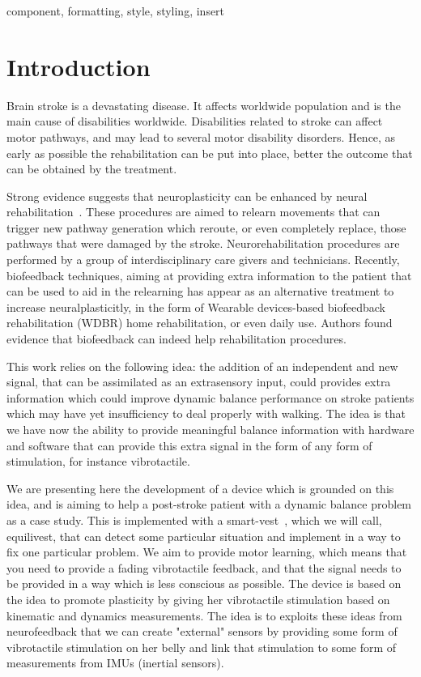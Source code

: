 \documentclass[conference]{IEEEtran}
\begin{document}
\begin{IEEEkeywords}
component, formatting, style, styling, insert
\end{IEEEkeywords}

\section{Introduction}

Brain stroke is a devastating disease.  It affects worldwide population and is the main cause of disabilities worldwide.  Disabilities related to stroke can affect motor pathways, and may lead to several motor disability disorders.  Hence, as early as possible the rehabilitation can be put into place, better the outcome that can be obtained by the treatment.   

Strong evidence suggests that neuroplasticity can be enhanced by neural rehabilitation~\cite{Albert.etal2012}.  These procedures are aimed to relearn movements that can trigger new pathway generation which reroute, or even completely replace, those pathways that were damaged by the stroke.  Neurorehabilitation procedures are performed by a group of interdisciplinary care givers and technicians.  Recently, biofeedback techniques, aiming at providing extra information to the patient that can be used to aid in the relearning has appear as an alternative treatment to increase neuralplasticitly, in the form of Wearable devices-based biofeedback rehabilitation (WDBR) home rehabilitation, or even daily use\cite{Peake.etal2018}.  Authors found evidence that biofeedback can indeed help rehabilitation procedures.

This work relies on the following idea:  the addition of an independent and new signal, that can be assimilated as an extrasensory input, could  provides extra information which could improve dynamic balance performance on stroke patients which may have yet insufficiency to deal properly with walking.  The idea is that we have now the ability to provide meaningful balance information with hardware and software that can provide this extra signal in the form of any form of stimulation, for instance vibrotactile.

We are presenting here the development of a device which is grounded on this idea, and is aiming to help a post-stroke patient with a dynamic balance problem as a case study.  This is implemented with a smart-vest~\cite{Brandebusemeyer.etal2021}, which we will call, equilivest, that can detect some particular situation and implement in a way to fix one particular problem.  We aim to provide motor learning, which means that you need to provide a fading vibrotactile feedback, and that the signal needs to be provided in a way which is less conscious as possible.  The device is based on the idea to promote plasticity by giving her vibrotactile stimulation based on kinematic and dynamics measurements.  The idea is to exploits these ideas from neurofeedback that we can create "external" sensors by providing some form of vibrotactile stimulation on her belly and link that stimulation to some form of measurements from IMUs (inertial sensors).
\end{document}
